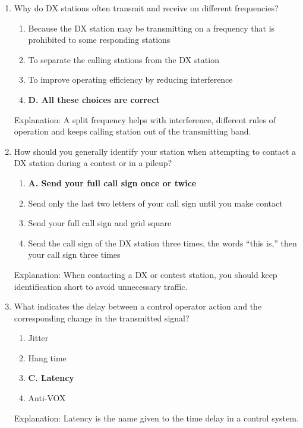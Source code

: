 \begin{enumerate}
      \item Why do DX stations often transmit and receive on different frequencies?
        \begin{enumerate}
     \item  Because the DX station may be transmitting on a frequency that is prohibited to some responding stations
         \item  To separate the calling stations from the DX station
    \item  To improve operating efficiency by reducing interference
      \item \textbf{D. All these choices are correct}
       \end{enumerate}
     \textcolor{myred}{Explanation:}
     A split frequency helps with interference, different rules of operation and keeps calling station out of the transmitting band.

   \item How should you generally identify your station when attempting to contact a DX station during a contest or in a pileup?
    \begin{enumerate}
    \item \textbf{A. Send your full call sign once or twice}
    \item  Send only the last two letters of your call sign until you make contact
  \item  Send your full call sign and grid square
  \item  Send the call sign of the DX station three times, the words “this is,” then your call sign three times
      \end{enumerate}
   \textcolor{myred}{Explanation:}
    When contacting a DX or contest station, you should keep identification short to avoid unnecessary traffic.

       \item What indicates the delay between a control operator action and the corresponding change in the transmitted signal?
    \begin{enumerate}
    \item  Jitter
      \item  Hang time
        \item \textbf{C. Latency}
      \item  Anti-VOX
        \end{enumerate}
        \textcolor{myred}{Explanation:}
    Latency is the name given to the time delay in a control system.
\end{enumerate}


